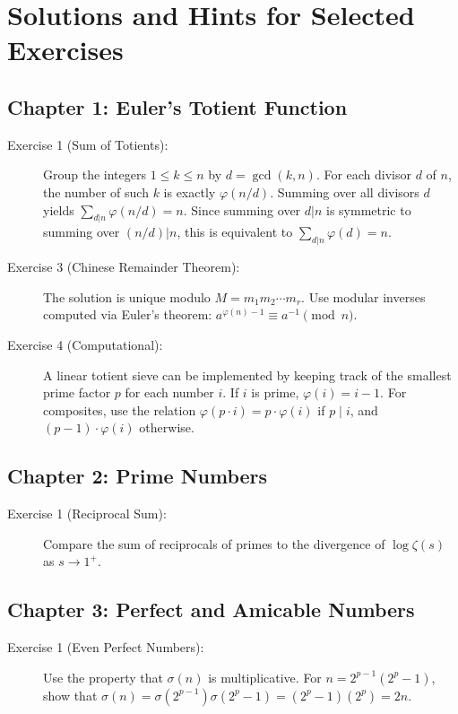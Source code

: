 
\section{Solutions and Hints for Selected Exercises}

\subsection{Chapter 1: Euler's Totient Function}
\begin{description}
    \item[Exercise 1 (Sum of Totients):] Group the integers $1 \le k \le n$ by $d = \gcd(k, n)$. For each divisor $d$ of $n$, the number of such $k$ is exactly $\varphi(n/d)$. Summing over all divisors $d$ yields $\sum_{d|n} \varphi(n/d) = n$. Since summing over $d|n$ is symmetric to summing over $(n/d)|n$, this is equivalent to $\sum_{d|n} \varphi(d) = n$.
    
    \item[Exercise 3 (Chinese Remainder Theorem):] The solution is unique modulo $M = m_1 m_2 \cdots m_r$. Use modular inverses computed via Euler's theorem: $a^{\varphi(n)-1} \equiv a^{-1} \pmod{n}$.
    
    \item[Exercise 4 (Computational):] A linear totient sieve can be implemented by keeping track of the smallest prime factor $p$ for each number $i$. If $i$ is prime, $\varphi(i) = i - 1$. For composites, use the relation $\varphi(p \cdot i) = p \cdot \varphi(i)$ if $p \mid i$, and $(p-1) \cdot \varphi(i)$ otherwise.
\end{description}

\subsection{Chapter 2: Prime Numbers}
\begin{description}
    \item[Exercise 1 (Reciprocal Sum):] Compare the sum of reciprocals of primes to the divergence of $\log \zeta(s)$ as $s \to 1^+$.
\end{description}

\subsection{Chapter 3: Perfect and Amicable Numbers}
\begin{description}
    \item[Exercise 1 (Even Perfect Numbers):] Use the property that $\sigma(n)$ is multiplicative. For $n = 2^{p-1}(2^p-1)$, show that $\sigma(n) = \sigma(2^{p-1})\sigma(2^p-1) = (2^p-1)(2^p) = 2n$.
\end{description}

